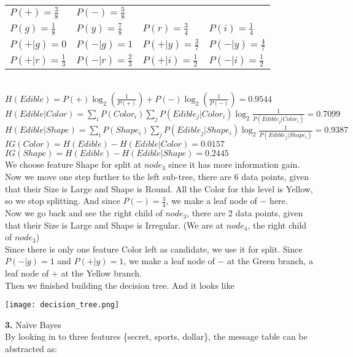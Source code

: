 \documentclass[11pt,a4paper,fleqn]{article}
\begin{document}
\begin{tabular}{llll}
$P(+) = \frac{3}{8}$&$P(-) = \frac{5}{8}$&&\\
$P(g)=\frac{1}{8}$&$P(y)=\frac{7}{8}$&$P(r)=\frac{3}{4}$&$P(i)=\frac{1}{4}$\\
$P(+|g)=0$&$P(-|g)=1$&$P(+|y)=\frac{3}{7}$&$P(-|y)=\frac{4}{7}$\\
$P(+|r)=\frac{1}{3}$&$P(-|r)=\frac{2}{3}$&$P(+|i)=\frac{1}{2}$&$P(-|i)=\frac{1}{2}$\\
\end{tabular}\\
$H(Edible) =  P(+)\log_2(\frac{1}{P(+)})+P(-)\log_2(\frac{1}{P(-)})=0.9544$\\
$H(Edible|Color) = \sum_iP(Color_i)\sum_jP(Edible_j|Color_i)\log_2\frac{1}{P(Edible_j|Color_i)}=0.7099$\\
$H(Edible|Shape) = \sum_iP(Shape_i)\sum_jP(Edible_j|Shape_i)\log_2\frac{1}{P(Edible_j|Shape_i)}=0.9387$\\
$IG(Color) = H(Edible) - H(Edible|Color) = 0.0157$\\
$IG(Shape) = H(Edible) - H(Edible|Shape) = 0.2445$\\
We choose feature Shape for split at $node_3$ since it has more information gain.\\
Now we move one step further to the left sub-tree, there are 6 data points, given that their Size is Large and Shape is Round. All the Color for this level is Yellow, so we stop splitting. And since $P(-)=\frac{3}{4}$, we make a leaf node of $-$ here.\\
Now we go back and see the right child of $node_3$, there are 2 data points, given that their Size is Large and Shape is Irregular. (We are at $node_4$, the right child of $node_3$)\\
Since there is only one feature Color left as candidate, we use it for split. Since $P(-|g)=1$ and $P(+|y) = 1$, we make a leaf node of $-$ at the Green branch, a leaf node of $+$ at the Yellow branch.\\
Then we finished building the decision tree. And it looks like\\
\begin{center}
\texttt{[image: decision\_tree.png]}\\
\end{center}
\newpage \noindent
\textbf{3.} Na\"{i}ve Bayes\\
By looking in to three features \{secret, sports, dollar\}, the message table can be abstracted as:\\
\end{document}
